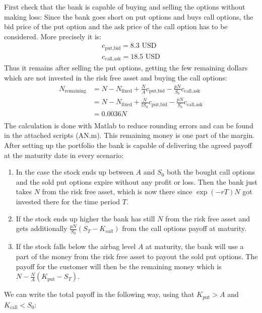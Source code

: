 \documentclass[11pt,oneside,a4paper]{article}
\begin{document}
	First check that the bank is capable of buying and selling the options without making loss:
	Since the bank goes short on put options and buys call options, the bid price of the put option and the ask price of the call option has to be considered. More precisely it is:
	\begin{align*}
	    c_{\text{put,bid}} = 8.3 \text{ USD}  \\
		c_{\text{call,ask}} = 18.5 \text{ USD}  
	\end{align*}
	Thus it remains after selling the put options, getting the few remaining dollars which are not invested in the risk free asset and buying the call options:
	\begin{align*}
		N_{\text{remaining}}  &= N - N_{\text{fixed}} + \frac{N}{A}c_{\text{put,bid}} - \frac{pN}{S_0} c_{\text{call,ask}} \\
		&= N - N_{\text{fixed}} + \frac{N}{lS_0}c_{\text{put,bid}} - \frac{pN}{S_0} c_{\text{call,ask}} \\
		&= 0.0036N \\ 
	\end{align*}
	The calculation is done with Matlab to reduce rounding errors and can be found in the attached scripts (AN.m). This remaining money is one part of the margin.
	After setting up the portfolio the bank is capable of delivering the agreed payoff at the maturity date in every scenario:
	\begin{enumerate}
		\item In the case the stock ends up between $ A $ and $ S_0 $ both the bought call options and the sold put options expire without any profit or loss. Then the bank just takes $ N $ from the risk free asset, which is now there since $ \exp(-rT)N $ got invested there for the time period $ T $.
		\item If the stock ends up higher the bank has still $ N $ from the risk free asset and gets additionally $ \frac{pN}{S_0} (S_T- K_{call})$ from the call options payoff at maturity.
		\item If the stock falls below the airbag level $ A $ at maturity, the bank will use a part of the money from the risk free asset to payout the sold put options. The payoff for the customer will then be the remaining money which is $ N - \frac{N}{A}(K_{\text{put}}-S_T) $.
	\end{enumerate}
	We can write the total payoff in the following way, using that $ K_{\text{put}} > A $ and $ K_{\text{call}} < S_0 $:
\end{document}
